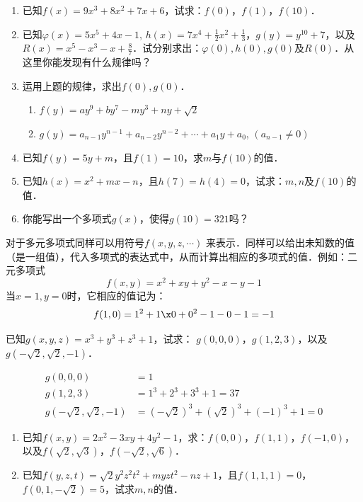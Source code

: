 \begin{ex}
    \begin{enumerate}
        \item 已知$f(x)=9x^3+8x^2+7x+6$，试求：$f(0)$，$f(1)$，$f(10)$．
        \item 已知$\varphi(x)=5x^5+4x-1$, $h(x)=7x^4+\frac{1}{2}x^2+\frac{1}{3}$，$g(y)=y^{10}+7$，以及$R(x)=x^5-x^3-x+\frac{8}{7}$．试分别求出：$\varphi(0), h(0), g(0)$及$R(0)$．从这里你能发现有什么规律吗？
        \item 运用上题的规律，求出$f(0),g(0)$．
        \begin{enumerate}
            \item $f(y)=ay^9+by^7-my^3+ny+\sqrt{2}$
            \item $g(y)=a_{n-1}y^{n-1}+a_{n-2}y^{n-2}+\cdots+a_1 y+a_0$, $(a_{n-1}\ne 0)$
        \end{enumerate}
        \item 已知$f(y)=5y+m$，且$f(1)=10$，求$m$与$f(10)$的值．
        \item 已知$h(x)=x^2+mx-n$，且$h(7)=h(4)=0$，试求：$m,n$及$f(10)$的值．
        \item 你能写出一个多项式$g(x)$，使得$g(10)=321$吗？
    \end{enumerate}
\end{ex}

对于多元多项式同样可以用符号$f(x,y,z,\cdots)$
来表示．同样可以给出未知数的值（是一组值），代入多项式的表达式中，从而计算出相应的多项式的值．例如：二元多项式$$f(x,y)=x^2+xy+y^2-x-y-1  $$
当$x=1,y=0$时，它相应的值记为：
$$f (1, 0) =1^2+1\x0+0^2-1-0-1=-1$$

\begin{example}
    已知$g(x,y,z)=x^3+y^3+z^3+1$，试求：
$g(0,0,0)$，$g(1,2,3)$，以及$g\left(-\sqrt{2},\sqrt{2},-1\right)$．
\end{example}

\begin{solution}
    \[\begin{split}
        g(0,0,0)&=1\\
        g(1,2,3)&=1^3+2^3+3^3+1=37\\
        g\left(-\sqrt{2},\sqrt{2},-1\right)&=\left(-\sqrt{2}\right)^3+\left(\sqrt{2}\right)^3+(-1)^3+1=0
    \end{split}\]
\end{solution}

\begin{ex}
    \begin{enumerate}
        \item 已知$f(x,y)=2x^2-3xy+4y^2-1$，求：$f(0,0)$，$f(1,1)$，$f(-1,0)$，以及$f(\sqrt{2},\sqrt{3})$，$f(-\sqrt{2},\sqrt{6})$．
        \item 已知$f(y,z,t)=\sqrt{2}y^2z^2t^2+myzt^2-nz+1$，且$f(1,1,1)=0$，$f(0,1,-\sqrt{2})=5$，试求$m,n$的值．
    \end{enumerate}
\end{ex}

